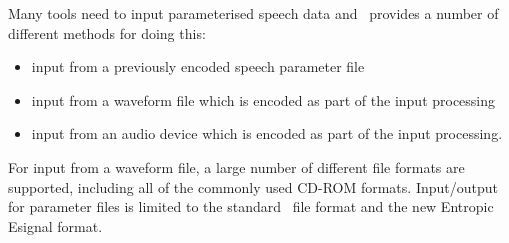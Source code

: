 %
%


Many tools need to input parameterised speech data and \HTK\ provides 
a number of different methods for doing this:
\begin{itemize}
\item input from a previously encoded speech parameter file
\item input from a waveform file which is encoded as part of the 
       input processing
\item input from an audio device which is encoded as part of the 
       input processing.
\end{itemize}
For input from a waveform file, a large number of different file formats
are supported, including all of the commonly used CD-ROM formats.
Input/output for parameter files is limited to the standard \HTK\ file format
and the new Entropic Esignal format.


